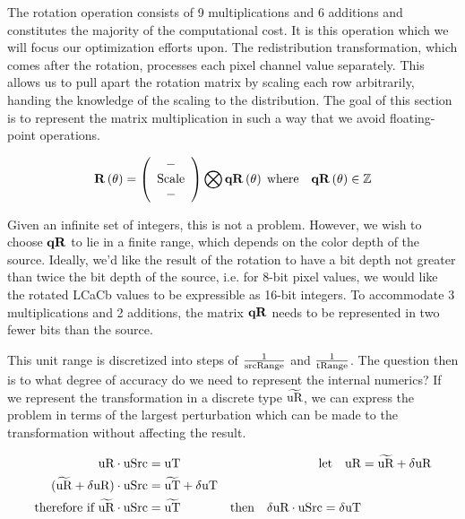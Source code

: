 The rotation operation consists of 9 multiplications and 6 additions and constitutes the majority of the computational cost. It is this operation which we will focus our optimization efforts upon. The redistribution transformation, which comes after the rotation, processes each pixel channel value separately. This allows us to pull apart the rotation matrix by scaling each row arbitrarily, handing the knowledge of the scaling to the distribution. The goal of this section is to represent the matrix multiplication in such a way that we avoid floating-point operations.

\begin{equation}\label{eq:NormRxyz4}
 \R[\theta] =
\left(
\begin{array}{c}
 -  \\
 \text{Scale} \\
 -  \\
\end{array}
\right)
\bigotimes
\qR[\theta]\;\text{where}\quad{\qR[\theta]\in\mathbb{Z}}
\end{equation}

Given an infinite set of integers, this is not a problem. However, we wish to choose $\qR$ to lie in a finite range, which depends on the color depth of the source. Ideally, we'd like the result of the rotation to have a bit depth not greater than twice the bit depth of the source, i.e. for 8-bit pixel values, we would like the rotated LCaCb values to be expressible as 16-bit integers. To accommodate 3 multiplications and 2 additions, the matrix $\qR$ needs to be represented in two fewer bits than the source.

This unit range is discretized into steps of $\frac{1}{\text{srcRange}}$ and $\frac{1}{\text{tRange}}$. The question then is to what degree of accuracy do we need to represent the internal numerics? If we represent the transformation in a discrete type $\widetilde{\text{uR}}$, we can express the problem in terms of the largest perturbation which can be made to the transformation without affecting the result.


\begin{equation}\label{eq:lxyPixel}
\begin{aligned}
\text{uR}  \cdot \text{uSrc} &= \text{uT}  &\text{let} \quad \text{uR} &= \widetilde{\text{uR}} + \delta\text{uR} \\
(\widetilde{\text{uR}} + \delta\text{uR})  \cdot \text{uSrc} &= \widetilde{\text{uT}} + \delta\text{uT} \\
\text{therefore if } \widetilde{\text{uR}} \cdot \text{uSrc} &= \widetilde{\text{uT}} & \text{then}\quad \delta\text{uR}  \cdot \text{uSrc} = \delta\text{uT}
\end{aligned} 
\end{equation}

